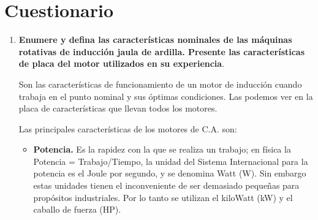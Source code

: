 \documentclass[a4paper,12pt]{article}
\begin{document}
\section{Cuestionario}
\begin{enumerate}
    \item \textbf{Enumere y defina las características nominales de las máquinas rotativas de inducción jaula de ardilla. Presente las características de placa del motor utilizados en su experiencia}.
    
    Son las características de funcionamiento de un motor de inducción cuando trabaja en el punto nominal y sus óptimas condiciones. Las podemos ver en la placa de características que llevan todos los motores.
    
    Las principales características de los motores de C.A. son:
    \begin{itemize}
        \item \textbf{Potencia.} Es la rapidez con la que se realiza un trabajo; en física la Potencia = Trabajo/Tiempo, la unidad del Sistema Internacional para la potencia es el Joule por segundo, y se denomina Watt (W). Sin embargo estas unidades tienen el inconveniente de ser demasiado pequeñas para propósitos industriales. Por lo tanto se utilizan el kiloWatt (kW) y el caballo de fuerza (HP).
        

\end{itemize}
\end{enumerate}
\end{document}
